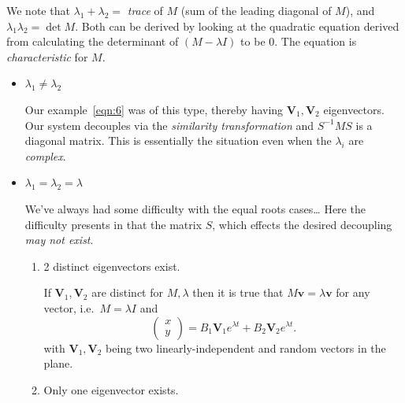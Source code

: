 \documentclass[12pt]{report}
\theoremstyle{definition}
\begin{document}
We note that $\lambda_1 + \lambda_2 =$ \emph{trace} of $M$ (sum of the leading diagonal of $M$),
and $\lambda_1\lambda_2 = \det{M}$. Both can be derived by looking at the quadratic equation
derived from calculating the determinant of $(M - \lambda I)$ to be $0$.
The equation is \emph{characteristic} for $M$.
\begin{itemize}
        \item $\lambda_1 \neq \lambda_2$

            Our example~\eqref{eqn:6} was of this type, thereby having
            $\pmb{V}_1, \pmb{V}_2$ eigenvectors. Our system decouples via 
            the \emph{similarity transformation} and $S^{-1}MS$ is a diagonal matrix.  
            This is essentially the situation even when the $\lambda_i$ are \emph{complex}.

        \item $\lambda_1 = \lambda_2 = \lambda$

            We've always had some difficulty with the equal roots cases\ldots
            Here the difficulty presents in that the matrix $S$, which effects
            the desired decoupling \emph{may not exist}.

            \begin{enumerate}[label = (\roman*)]
                \item 2 distinct eigenvectors exist.
                    
                    If $\pmb{V}_1, \pmb{V}_2$ are distinct for $M, \lambda$
                    then it is true that $M\pmb{v} = \lambda\pmb{v}$ for any vector,
                    i.e.\ $M = \lambda I$ and\[
                        \begin{pmatrix}
                                x \\
                                y
                        \end{pmatrix} = B_1 \pmb{V}_1 e^{\lambda t} + B_2 \pmb{V}_2 e^{\lambda t}.
                    \]
                    with $\pmb{V}_1, \pmb{V}_2$ being two linearly-independent 
                    and random vectors in the plane.

                \item Only one eigenvector exists.


\end{enumerate}
\end{itemize}
\end{document}
